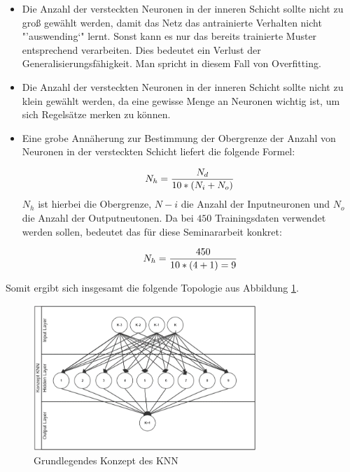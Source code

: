 \begin{itemize}
\item Die Anzahl der versteckten Neuronen in der inneren Schicht sollte nicht zu groß gewählt werden, damit das Netz das antrainierte Verhalten nicht "'auswending`" lernt. Sonst kann es nur das bereits trainierte Muster entsprechend verarbeiten. Dies bedeutet ein Verlust der Generalisierungsfähigkeit. Man spricht in diesem Fall von Overfitting.

\item Die Anzahl der versteckten Neuronen in der inneren Schicht sollte nicht zu klein gewählt werden, da eine gewisse Menge an Neuronen wichtig ist, um sich Regelsätze merken zu können.

\item Eine grobe Annäherung zur Bestimmung der Obergrenze der Anzahl von Neuronen in der versteckten Schicht liefert die folgende Formel:

\begin{equation}\formelentry{Optimale Anzahl Neuronen in der versteckten Schicht}
  N_h = \frac{N_d}{10*(N_i+N_o)}
\end{equation}
$N_h$ ist hierbei die Obergrenze, $N-i$ die Anzahl der Inputneuronen und $N_o$ die Anzahl der Outputneutonen. Da bei $450$ Trainingsdaten verwendet werden sollen, bedeutet das für diese Seminararbeit konkret:

\begin{equation}\formelentry{Optimale Anzahl Neuronen in der versteckten Schicht}
  N_h = \frac{450}{10*(4+1) = 9 }   
\end{equation}
\end{itemize}
 
Somit ergibt sich insgesamt die folgende Topologie aus Abbildung \ref{fig:Grundlegende Topologie des KNN}. 

\begin{figure}[H]
\centering
		\includegraphics[width=0.75\textwidth]{KonzKNN.PNG}
	\caption{Grundlegendes Konzept des KNN}
	\label{fig:Grundlegende Topologie des KNN}
\end{figure}

